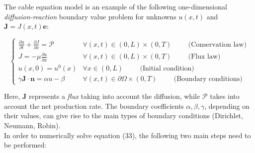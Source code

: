 \documentclass[a4paper]{article}
\begin{document}
The cable equation model is an example of the following one-dimensional \textit{diffusion-reaction} boundary value problem for unknowns $ u(x,t)$ and $\textbf{J} = J(x,t)\textbf{e}$:


\begin{equation}
\begin{cases}
\frac{\partial u}{\partial t} +\frac{\partial J}{\partial x} = \mathcal{P} & \forall (x,t) \in (0,L) \times (0,T) \hspace{1cm} \text{(Conservation law)} \\
J = - \mu \frac{\partial u}{\partial x} & \forall (x,t) \in (0,L) \times (0,T) \hspace{1cm} \text{(Flux law)}\\
u(x,0) = u^0(x) & \forall x \in (0,L) \hspace{1cm}  \text{(Initial condition)} \\
\gamma \textbf{J} \cdot \textbf{n} = \alpha u - \beta &  \forall (x,t) \in \partial \Omega \times (0,T) \hspace{1cm} \text{(Boundary conditions)}
\end{cases}
\end{equation}

Here, $\textbf{J}$  represents a \textit{flux} taking into account the diffusion, while $\mathcal{P}$ takes into account the  net production rate. The boundary coefficients $\alpha, \beta, \gamma$, depending on their values, can give rise to the main types of boundary conditions (Dirichlet, Neumann, Robin).\\
In order to numerically solve equation (33), the following two main steps need to be performed:
\end{document}
